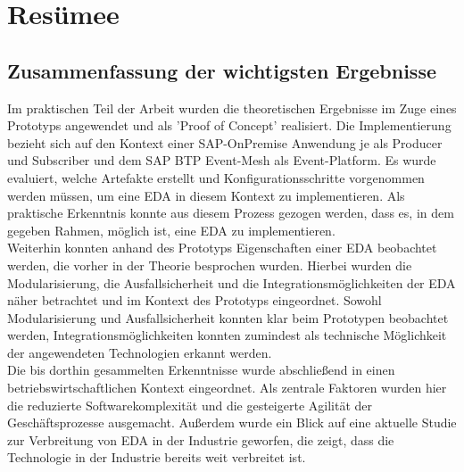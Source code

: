 \section{Resümee}
\subsection{Zusammenfassung der wichtigsten Ergebnisse}
Im praktischen Teil der Arbeit wurden die theoretischen Ergebnisse im Zuge eines Prototyps angewendet und als 'Proof of Concept' realisiert. Die Implementierung bezieht sich auf den Kontext einer SAP-OnPremise Anwendung je als Producer und Subscriber und dem SAP BTP Event-Mesh als Event-Platform. Es wurde evaluiert, welche Artefakte erstellt und Konfigurationsschritte vorgenommen werden müssen, um eine \ac{EDA} in diesem Kontext zu implementieren. Als praktische Erkenntnis konnte aus diesem Prozess gezogen werden, dass es, in dem gegeben Rahmen, möglich ist, eine \ac{EDA} zu implementieren. \\
Weiterhin konnten anhand des Prototyps Eigenschaften einer \ac{EDA} beobachtet werden, die vorher in der Theorie besprochen wurden. Hierbei wurden die Modularisierung, die Ausfallsicherheit und die Integrationsmöglichkeiten der \ac{EDA} näher betrachtet und im Kontext des Prototyps eingeordnet. Sowohl Modularisierung und Ausfallsicherheit konnten klar beim Prototypen beobachtet werden, Integrationsmöglichkeiten konnten zumindest als technische Möglichkeit der angewendeten Technologien erkannt werden. \\
Die bis dorthin gesammelten Erkenntnisse wurde abschließend in einen betriebswirtschaftlichen Kontext eingeordnet. Als zentrale Faktoren wurden hier die reduzierte Softwarekomplexität und die gesteigerte Agilität der Geschäftsprozesse ausgemacht. Außerdem wurde ein Blick auf eine aktuelle Studie zur Verbreitung von \ac{EDA} in der Industrie geworfen, die zeigt, dass die Technologie in der Industrie bereits weit verbreitet ist.

